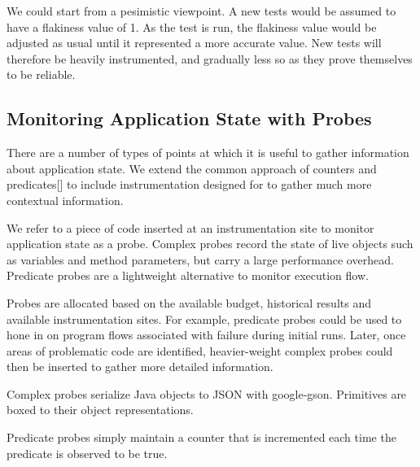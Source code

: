 {We could start from a pesimistic viewpoint. A new tests would be assumed to have
a flakiness value of 1. As the test is run, the flakiness value would be
adjusted as usual until it represented a more accurate value. New tests will
therefore be heavily instrumented, and gradually less so as they prove
themselves to be reliable.

\subsection{Monitoring Application State with Probes}
\label{sec:probes}

There are a number of types of points at which it is useful to gather
information about application state. We extend the common approach of counters
and predicates[] to include instrumentation designed for to gather much more
contextual information.

We refer to a piece of code inserted at an instrumentation site to monitor
application state as a probe. Complex probes record the state of live objects
such as variables and method parameters, but carry a large performance overhead.
Predicate probes are a lightweight alternative to monitor execution flow.

Probes are allocated based on the available budget, historical results and
available instrumentation sites. For example, predicate probes could be used to
hone in on program flows associated with failure during initial runs. Later,
once areas of problematic code are identified, heavier-weight complex probes
could then be inserted to gather more detailed information.

Complex probes serialize Java objects to JSON with google-gson. Primitives are
boxed to their object representations.

Predicate probes simply maintain a counter that is incremented each time the
predicate is observed to be true.

}
